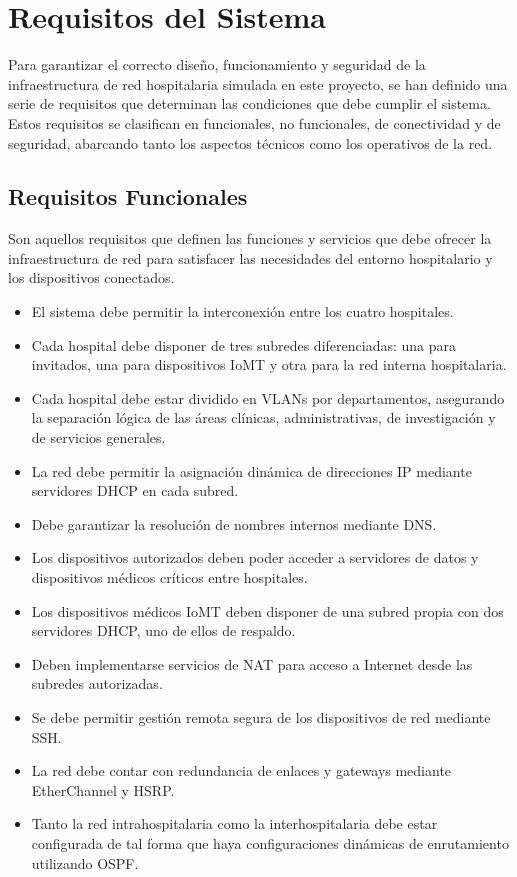 \section{Requisitos del Sistema}
Para garantizar el correcto diseño, funcionamiento y seguridad de la infraestructura de red hospitalaria simulada en este proyecto, se han definido una serie de requisitos 
que determinan las condiciones que debe cumplir el sistema. Estos requisitos se clasifican en funcionales, no funcionales, de conectividad y de seguridad, abarcando tanto 
los aspectos técnicos como los operativos de la red.

\subsection{Requisitos Funcionales}
Son aquellos requisitos que definen las funciones y servicios que debe ofrecer la infraestructura de red para satisfacer las necesidades del entorno hospitalario y los 
dispositivos conectados.
\begin{itemize}
    \item El sistema debe permitir la interconexión entre los cuatro hospitales.
    \item Cada hospital debe disponer de tres subredes diferenciadas: una para invitados, una para dispositivos IoMT y otra para la red interna hospitalaria.
    \item Cada hospital debe estar dividido en VLANs por departamentos, asegurando la separación lógica de las áreas clínicas, administrativas, de investigación y de servicios generales.
    \item La red debe permitir la asignación dinámica de direcciones IP mediante servidores DHCP en cada subred.
    \item Debe garantizar la resolución de nombres internos mediante DNS.
    \item Los dispositivos autorizados deben poder acceder a servidores de datos y dispositivos médicos críticos entre hospitales.
    \item Los dispositivos médicos IoMT deben disponer de una subred propia con dos servidores DHCP, uno de ellos de respaldo.
    \item Deben implementarse servicios de NAT para acceso a Internet desde las subredes autorizadas.
    \item Se debe permitir gestión remota segura de los dispositivos de red mediante SSH.
    \item La red debe contar con redundancia de enlaces y gateways mediante EtherChannel y HSRP.
    \item Tanto la red intrahospitalaria como la interhospitalaria debe estar configurada de tal forma que haya configuraciones dinámicas de enrutamiento utilizando OSPF.
\end{itemize}
